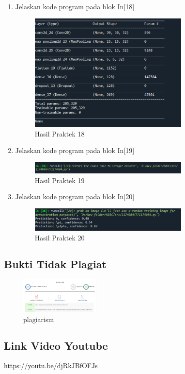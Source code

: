 \begin{enumerate}
\item Jelaskan kode program pada blok In[18]
	
\begin{figure}[H]
    \includegraphics[width=8cm]{figures/1174084/7/18.png}
    \centering
    \caption{Hasil Praktek 18}
\end{figure}

\item Jelaskan kode program pada blok In[19]
	
\begin{figure}[H]
    \includegraphics[width=8cm]{figures/1174084/7/19.png}
    \centering
    \caption{Hasil Praktek 19}
\end{figure}

\item Jelaskan kode program pada blok In[20]
	
\begin{figure}[H]
    \includegraphics[width=8cm]{figures/1174084/7/20.png}
    \centering
    \caption{Hasil Praktek 20}
\end{figure}

\end{enumerate}


\subsection{Bukti Tidak Plagiat}
\begin{figure}[H]
	\includegraphics[width=4cm]{figures/1174084/7/plagiarism.png}
	\centering
	\caption{plagiarism}
\end{figure}


\subsection{Link Video Youtube}
https://youtu.be/djRkJBfOFJs

